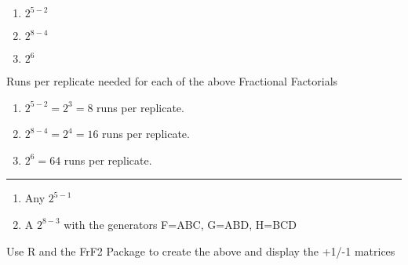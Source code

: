 \documentclass[12pt]{article}
\begin{document}

\begin{enumerate}
  \item $2^{5-2}$
  \item $2^{8-4}$
  \item $2^6$
\end{enumerate}


Runs per replicate needed for each of the above Fractional Factorials


\begin{enumerate}
  \item $2^{5-2} = 2^3 = 8$ runs per replicate.
  \item $2^{8-4} = 2^4 = 16$ runs per replicate.
  \item $2^6 = 64$ runs per replicate.
\end{enumerate}


\vspace{0.5in}
\noindent\hfil\rule{0.5\textwidth}{.8pt}\hfil



\begin{enumerate}
  \item Any $2^{5-1}$
  \item A $2^{8-3}$ with the generators F=ABC, G=ABD, H=BCD
\end{enumerate}


Use R and the FrF2 Package to create the above and display the +1/-1 matrices

\newpage
\end{document}
